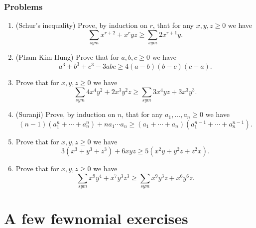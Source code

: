 \subsubsection{Problems}
\begin{enumerate}
\item (Schur's inequality) Prove, by induction on $r$, that for any $x,y,z\ge 0$ we have
\[
\sum_{sym} x^{r+2} + x^ryz \ge \sum_{sym} 2x^{r+1}y.
\]

\item (Pham Kim Hung) Prove that for $a,b,c\ge 0$ we have
\[
a^3+b^3+c^3-3abc \ge 4(a-b)(b-c)(c-a).
\]

\item Prove that for $x,y,z\ge 0$ we have
\[
\sum_{sym} 4x^4y^2 + 2x^3y^2z \ge \sum_{sym} 3x^4yz + 3x^3y^3.
\]

\item (Suranji) Prove, by induction on $n$, that for any $a_1, ..., a_n\ge 0$ we have
\[
(n-1)(a_1^n+\cdots +a_n^n)+na_1\cdots a_n \ge (a_1+\cdots +a_n)(a_1^{n-1}+\cdots +a_n^{n-1}).
\]

\item Prove that for $x,y,z\ge 0$ we have
\[
3(x^3+y^3+z^3) + 6xyz \ge 5(x^2y+y^2z+z^2x).
\]

\item Prove that for $x,y,z\ge 0$ we have
\[
\sum_{sym} x^9y^4 + x^7y^3z^3 \ge \sum_{sym} x^9y^3z + x^6y^6z.
\]
\end{enumerate}


\section{A few fewnomial exercises}

